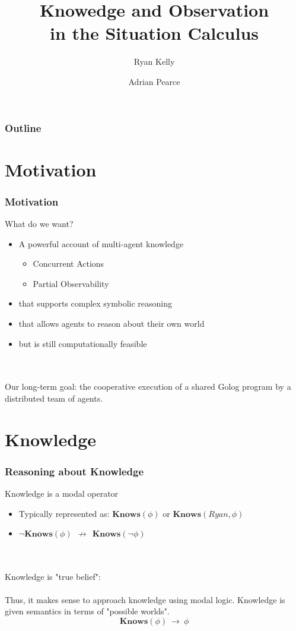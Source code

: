 \documentclass{beamer}
\title{Knowedge and Observation\\ in the Situation Calculus}
\author[Ryan Kelly (rfk@csse.unimelb.edu.au)]{Ryan Kelly \and Adrian Pearce}
\begin{document}
\begin{frame}
  \titlepage
\end{frame}

\begin{frame}
  \frametitle{Outline}
  \tableofcontents
\end{frame}

\section{Motivation}

\begin{frame}
\frametitle{Motivation}
What do we want?
\begin{itemize}
\item A powerful account of multi-agent knowledge
  \begin{itemize}
  \item Concurrent Actions
  \item Partial Observability
  \end{itemize}
\item that supports complex symbolic reasoning
\item that allows agents to reason about their own world
\item but is still computationally feasible
\end{itemize}
\ \\
\ \\
\pause
Our long-term goal: the cooperative execution of a shared Golog program
by a distributed team of agents.
\end{frame}


\section{Knowledge}

\begin{frame}
\frametitle{Reasoning about Knowledge}

Knowledge is a modal operator
\begin{itemize}
\item Typically represented as: $\mathbf{Knows}(\phi)$ or $\mathbf{Knows}(Ryan,\phi)$
\item $\neg\mathbf{Knows}(\phi)\ \ \not\rightarrow\ \ \mathbf{Knows}(\neg\phi)$
\end{itemize}
\ \\
\ \\
Knowledge is "true belief":
\ \\
\ \\
Thus, it makes sense to approach knowledge using modal logic.
Knowledge is given semantics in terms of "possible worlds".
\[ \mathbf{Knows}(\phi)\ \rightarrow\ \phi \]

\end{frame}
\end{document}
